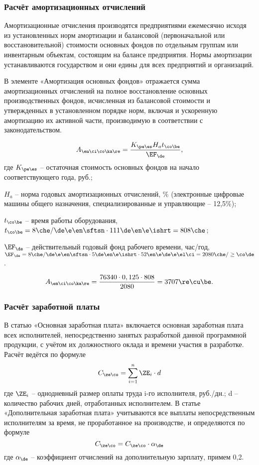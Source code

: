 \subsubsection{Расчёт амортизационных отчислений}
Амортизационные отчисления производятся предприятиями ежемесячно исходя из установленных норм амортизации и балансовой (первоначальной или восстановительной) стоимости основных фондов по отдельным группам или инвентарным объектам, состоящим на балансе предприятия. Нормы амортизации устанавливаются государством и они едины для всех предприятий и организаций.

В элементе «Амортизация основных фондов» отражается сумма амортизационных отчислений на полное восстановление основных производственных фондов, исчисленная из балансовой стоимости и утвержденных в установленном порядке норм, включая и ускоренную амортизацию их активной части, производимую в соответствии с законодательством.

\begin{equation*}
    A_{\en\ci\co\ka\re} = \frac{K_{\pe\es} H_a t_{\co\be}}{\EF_{\de}},
\end{equation*}
где $K_{\pe\es}$ -- остаточная стоимость основных фондов на начало соответствующего года, руб.;

$H_a$ -- норма годовых амортизационных отчислений, \% (электронные цифровые машины общего назначения, специализированные и управляющие -- 12,5\%);

$t_{\co\be}$ -- время работы оборудования, $t_{\co\be} = 8 \che / \de\e\en\sftsn \cdot 111 \de\en\e\ishrt = 808 \che$;

$\EF_{\de}$ -- действительный годовый фонд рабочего времени, час/год, $\EF_{\de} = 8 \che / \de\e\en\sftsn \cdot 5 \de\en\e\ishrt \cdot 52 \en\e\de\e\el\ci = 2080 \che / \ge\co\de$.

\begin{equation*}
    A_{\en\ci\co\ka\re} = \frac{76340 \cdot 0,125 \cdot 808}{2080} = 3707 \re\cu\be.
\end{equation*}

\subsubsection{Расчёт заработной платы}
В статью «Основная заработная плата» включается основная заработная плата всех исполнителей, непосредственно занятых разработкой данной программной продукции, с учётом их должностного оклада и времени участия в разработке. Расчёт ведётся по формуле 
\begin{equation*}
    C_{\ze\co} = \sum_{i=1}^{n} {\ZE_i \cdot d}
\end{equation*}
где $\ZE_i$ -- однодневный размер оплаты труда i-го исполнителя, руб./дн.; d -- количество рабочих дней, отработанных исполнителем. 
В статье «Дополнительная заработная плата» учитываются все выплаты непосредственным исполнителям за время, не проработанное на производстве, и определяются по формуле
\begin{equation*}
    C_{\ze\co} = C_{\ze\co} \cdot \alpha_{\de}
\end{equation*}
где $\alpha_{\de}$ -- коэффициент отчислений на дополнительную зарплату, примем 0,2.

